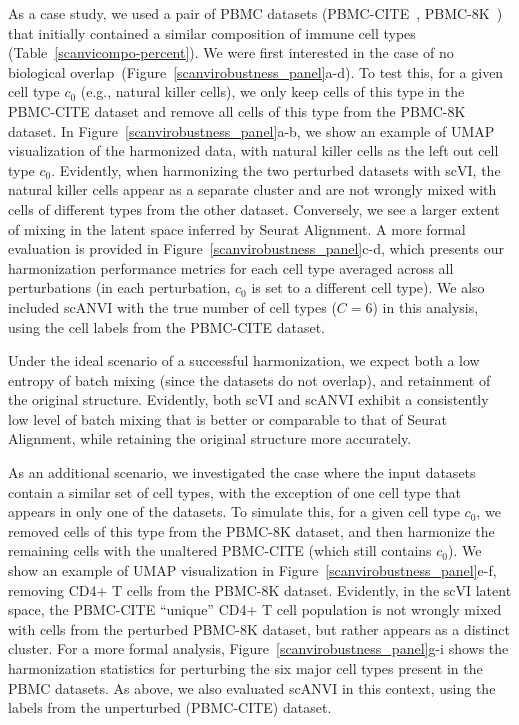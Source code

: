 As a case study, we used a pair of PBMC datasets (PBMC-CITE~\cite{stoeckius2017simultaneous}, PBMC-8K~\cite{10x}) that initially contained a similar composition of immune cell types (Table~\ref{scanvicompo-percent}). We were first interested in the case of no biological overlap~(Figure~\ref{scanvirobustness_panel}a-d). To test this, for a given cell type $c_0$ (e.g., natural killer cells), we only keep cells of this type in the PBMC-CITE dataset and remove all cells of this type from the PBMC-8K dataset. In Figure~\ref{scanvirobustness_panel}a-b, we show an example of UMAP visualization of the harmonized data, with natural killer cells as the left out cell type $c_0$. Evidently, when harmonizing the two perturbed datasets with scVI, the natural killer cells appear as a separate cluster and are not wrongly mixed with cells of different types from the other dataset. Conversely, we see a larger extent of mixing in the latent space inferred by Seurat Alignment. A more formal evaluation is provided in Figure~\ref{scanvirobustness_panel}c-d, which presents our harmonization performance metrics for each cell type averaged across all perturbations (in each perturbation, $c_0$ is set to a different cell type). We also included scANVI with the true number of cell types ($C=6$) in this analysis, using the cell labels from the PBMC-CITE dataset. 

 


Under the ideal scenario of a successful harmonization, we expect both a low entropy of batch mixing (since the datasets do not overlap), and retainment of the original structure. Evidently, both scVI and scANVI exhibit a consistently low level of batch mixing that is better or comparable to that of Seurat Alignment, while retaining the original structure more accurately.

As an additional scenario, we investigated the case where the input datasets contain a similar set of cell types, with the exception of one cell type that appears in only one of the datasets. To simulate this, for a given cell type $c_0$, we removed cells of this type from the PBMC-8K dataset, and then harmonize the remaining cells with the unaltered PBMC-CITE (which still contains $c_0$). We show an example of UMAP visualization in Figure~\ref{scanvirobustness_panel}e-f, removing CD4+ T cells from the PBMC-8K dataset. Evidently, in the scVI latent space, the PBMC-CITE ``unique'' CD4+ T cell population is not wrongly mixed with cells from the perturbed PBMC-8K dataset, but rather appears as a distinct cluster. For a more formal analysis, Figure~\ref{scanvirobustness_panel}g-i shows the harmonization statistics for perturbing the six major cell types present in the PBMC datasets. As above, we also evaluated scANVI in this context, using the labels from the unperturbed (PBMC-CITE) dataset.


